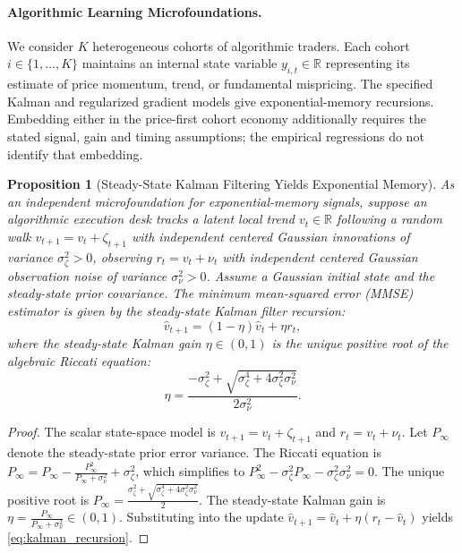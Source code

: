 \documentclass[12pt]{article}
\newtheorem{proposition}[theorem]{Proposition}
\theoremstyle{definition}
\theoremstyle{remark}
\newcommand{\R}{\mathbb{R}}
\begin{document}
\paragraph{Algorithmic Learning Microfoundations.}
We consider $K$ heterogeneous cohorts of algorithmic traders. Each cohort $i \in \{1, \dots, K\}$ maintains an internal state variable $y_{i,t} \in \R$ representing its estimate of price momentum, trend, or fundamental mispricing. The specified Kalman and regularized gradient models give exponential-memory recursions. Embedding either in the price-first cohort economy additionally requires the stated signal, gain and timing assumptions; the empirical regressions do not identify that embedding.

\begin{proposition}[Steady-State Kalman Filtering Yields Exponential Memory]
\label{prop:kalman}
As an independent microfoundation for exponential-memory signals, suppose an algorithmic execution desk tracks a latent local trend $v_t \in \R$ following a random walk $v_{t+1} = v_t + \zeta_{t+1}$ with independent centered Gaussian innovations of variance $\sigma_\zeta^2>0$, observing $r_t=v_t+\nu_t$ with independent centered Gaussian observation noise of variance $\sigma_\nu^2>0$. Assume a Gaussian initial state and the steady-state prior covariance. The minimum mean-squared error (MMSE) estimator is given by the steady-state Kalman filter recursion:
\begin{equation}
\hat{v}_{t+1} = (1 - \eta) \hat{v}_t + \eta r_t,
\label{eq:kalman_recursion}
\end{equation}
where the steady-state Kalman gain $\eta \in (0, 1)$ is the unique positive root of the algebraic Riccati equation:
\begin{equation}
\eta = \frac{-\sigma_\zeta^2 + \sqrt{\sigma_\zeta^4 + 4 \sigma_\zeta^2 \sigma_\nu^2}}{2 \sigma_\nu^2}.
\end{equation}
\end{proposition}

\begin{proof}
The scalar state-space model is $v_{t+1} = v_t + \zeta_{t+1}$ and $r_t = v_t + \nu_t$. Let $P_{\infty}$ denote the steady-state prior error variance. The Riccati equation is $P_\infty = P_\infty - \frac{P_\infty^2}{P_\infty + \sigma_\nu^2} + \sigma_\zeta^2$, which simplifies to $P_\infty^2 - \sigma_\zeta^2 P_\infty - \sigma_\zeta^2 \sigma_\nu^2 = 0$. The unique positive root is $P_\infty = \frac{\sigma_\zeta^2 + \sqrt{\sigma_\zeta^4 + 4\sigma_\zeta^2 \sigma_\nu^2}}{2}$. The steady-state Kalman gain is $\eta = \frac{P_\infty}{P_\infty + \sigma_\nu^2} \in (0, 1)$. Substituting into the update $\hat{v}_{t+1} = \hat{v}_t + \eta (r_t - \hat{v}_t)$ yields \eqref{eq:kalman_recursion}.
\end{proof}
\end{document}
